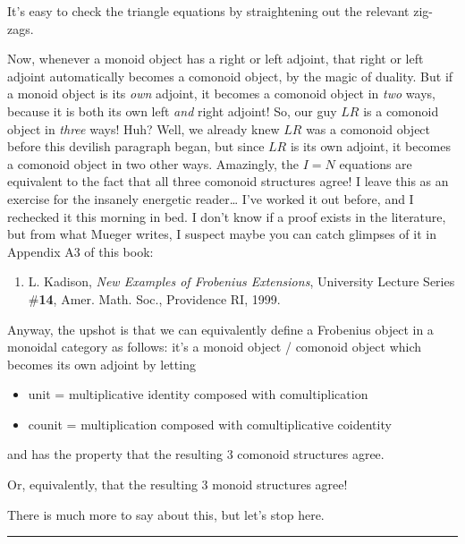 \documentclass{article}
\def\tightlist{}
\begin{document}
It's easy to check the triangle equations by straightening out the
relevant zig-zags.

Now, whenever a monoid object has a right or left adjoint, that right or
left adjoint automatically becomes a comonoid object, by the magic of
duality. But if a monoid object is its \emph{own} adjoint, it becomes a
comonoid object in \emph{two} ways, because it is both its own left
\emph{and} right adjoint! So, our guy \(LR\) is a comonoid object in
\emph{three} ways! Huh? Well, we already knew \(LR\) was a comonoid
object before this devilish paragraph began, but since \(LR\) is its own
adjoint, it becomes a comonoid object in two other ways. Amazingly, the
\(I = N\) equations are equivalent to the fact that all three comonoid
structures agree! I leave this as an exercise for the insanely energetic
reader\ldots{} I've worked it out before, and I rechecked it this
morning in bed. I don't know if a proof exists in the literature, but
from what Mueger writes, I suspect maybe you can catch glimpses of it in
Appendix A3 of this book:

\begin{enumerate}
\def\labelenumi{\arabic{enumi})}
\setcounter{enumi}{5}
\tightlist
\item
  L. Kadison, \emph{New Examples of Frobenius Extensions}, University
  Lecture Series \#\textbf{14}, Amer. Math. Soc., Providence RI, 1999.
\end{enumerate}

Anyway, the upshot is that we can equivalently define a Frobenius object
in a monoidal category as follows: it's a monoid object / comonoid
object which becomes its own adjoint by letting

\begin{itemize}
\tightlist
\item
  unit = multiplicative identity composed with comultiplication
\item
  counit = multiplication composed with comultiplicative coidentity
\end{itemize}

and has the property that the resulting 3 comonoid structures agree.

Or, equivalently, that the resulting 3 monoid structures agree!

There is much more to say about this, but let's stop here.

\begin{center}\rule{0.5\linewidth}{0.5pt}\end{center}
\end{document}
